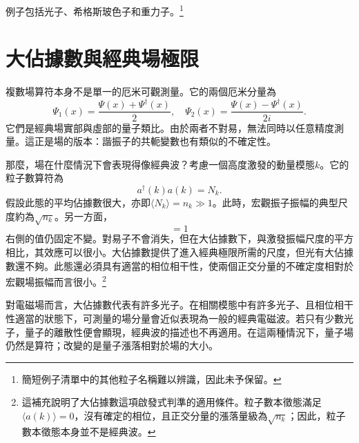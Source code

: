 \begin{classroomqa}
\end{classroomqa}


例子包括光子、希格斯玻色子和重力子。\footnote{簡短例子清單中的其他粒子名稱難以辨識，因此未予保留。}

\section{大佔據數與經典場極限}

複數場算符本身不是單一的厄米可觀測量。它的兩個厄米分量為
\begin{equation}
\Psi_1(x)=\frac{\Psi(x)+\Psi^\dagger(x)}{2},
\quad
\Psi_2(x)=\frac{\Psi(x)-\Psi^\dagger(x)}{2i}.
\end{equation}
它們是經典場實部與虛部的量子類比。由於兩者不對易，無法同時以任意精度測量。這正是場的版本：諧振子的共軛變數也有類似的不確定性。

那麼，場在什麼情況下會表現得像經典波？考慮一個高度激發的動量模態\(k\)。它的粒子數算符為
\begin{equation}
a^\dagger(k)a(k)=N_k.
\end{equation}
假設此態的平均佔據數很大，亦即\(\langle N_k\rangle=n_k\gg 1\)。此時，宏觀振子振幅的典型尺度約為\(\sqrt{n_k}\)。另一方面，
\begin{equation}
[a(k),a^\dagger(k)]=1
\end{equation}
右側的值仍固定不變。對易子不會消失，但在大佔據數下，與激發振幅尺度的平方相比，其效應可以很小。大佔據數提供了進入經典極限所需的尺度，但光有大佔據數還不夠。此態還必須具有適當的相位相干性，使兩個正交分量的不確定度相對於宏觀場振幅而言很小。\footnote{這補充說明了大佔據數這項啟發式判準的適用條件。粒子數本徵態滿足\(\langle a(k)\rangle=0\)，沒有確定的相位，且正交分量的漲落量級為\(\sqrt{n_k}\)；因此，粒子數本徵態本身並不是經典波。}

對電磁場而言，大佔據數代表有許多光子。在相關模態中有許多光子、且相位相干性適當的狀態下，可測量的場分量會近似表現為一般的經典電磁波。若只有少數光子，量子的離散性便會顯現，經典波的描述也不再適用。在這兩種情況下，量子場仍然是算符；改變的是量子漲落相對於場的大小。

\begin{classroomqa}
\end{classroomqa}

